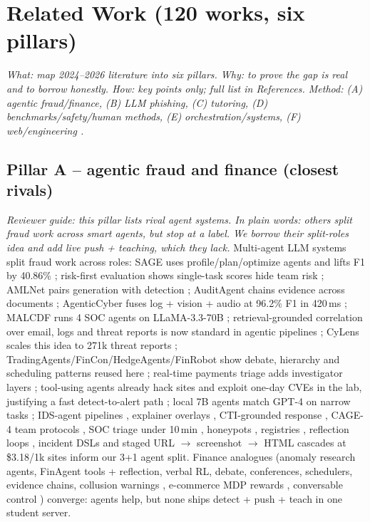 \documentclass[11pt,a4paper]{article}
\begin{document}
\section{Related Work (120 works, six pillars)}
\noindent\textit{What: map 2024--2026 literature into six pillars. Why: to prove the gap is real and to borrow honestly. How: key points only; full list in References. Method: (A) agentic fraud/finance, (B) LLM phishing, (C) tutoring, (D) benchmarks/safety/human methods, (E) orchestration/systems, (F) web/engineering \cite{AutoGen24,SAGA25,Aegis25,AIR26,FastAPI24,Mongo24,EdgeTTS24,Moviepy24,HTTPX24,Pytest24}.}

\subsection{Pillar A -- agentic fraud and finance (closest rivals)}
\noindent\textit{Reviewer guide: this pillar lists rival agent systems. In plain words: others split fraud work across smart agents, but stop at a label. We borrow their split-roles idea and add live push + teaching, which they lack.}
Multi-agent LLM systems split fraud work across roles: SAGE uses profile/plan/optimize agents and lifts F1 by 40.86\% \cite{SAGE26}; risk-first evaluation shows single-task scores hide team risk \cite{RiskFirst26}; AMLNet pairs generation with detection \cite{AMLNet25}; AuditAgent chains evidence across documents \cite{AuditAgent25}; AgenticCyber fuses log + vision + audio at 96.2\% F1 in 420\,ms \cite{AgenticCyber25}; MALCDF runs 4 SOC agents on LLaMA-3.3-70B \cite{MALCDF25}; retrieval-grounded correlation over email, logs and threat reports is now standard in agentic pipelines \cite{CyLens25,SAGA25}; CyLens scales this idea to 271k threat reports \cite{CyLens25}; TradingAgents/FinCon/HedgeAgents/FinRobot show debate, hierarchy and scheduling patterns reused here \cite{TradingAgents24,FinCon24,HedgeAgents25,FinRobot24,Park24,FinAgent24}; real-time payments triage adds investigator layers \cite{IJCISIM26}; tool-using agents already hack sites and exploit one-day CVEs in the lab, justifying a fast detect-to-alert path \cite{FangHack24,FangExploit24,PentestGPT24}; local 7B agents match GPT-4 on narrow tasks \cite{Rigaki24}; IDS-agent pipelines \cite{IDSAgent24}, explainer overlays \cite{Houssel24}, CTI-grounded response \cite{Tellache25}, CAGE-4 team protocols \cite{Castro25}, SOC triage under 10\,min \cite{Saju26}, honeypots \cite{Honeypot24}, registries \cite{SAGA25}, reflection loops \cite{Aegis25}, incident DSLs \cite{AIR26} and staged URL $\rightarrow$ screenshot $\rightarrow$ HTML cascades at \$3.18/1k sites \cite{CLASP25} inform our 3+1 agent split. Finance analogues (anomaly research agents, FinAgent tools + reflection, verbal RL, debate, conferences, schedulers, evidence chains, collusion warnings \cite{Collude25}, e-commerce MDP rewards \cite{Qu25}, conversable control \cite{AutoGen24}) converge: agents help, but none ships detect + push + teach in one student server.
\end{document}
